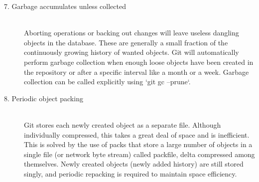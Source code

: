 \begin{description}
\item[7. Garbage accumulates unless collected] \hfill \\
  Aborting operations or backing out changes will leave useless dangling objects
  in the database. These are generally a small fraction of the continuously
  growing history of wanted objects. Git will automatically perform garbage
  collection when enough loose objects have been created in the repository or
  after a specific interval like a month or a week. Garbage collection can be
  called explicitly using ‘git gc –prune‘.

\item[8. Periodic object packing] \hfill \\
  Git stores each newly created object as a separate file. Although individually
  compressed, this takes a great deal of space and is inefficient. This is
  solved by the use of packs that store a large number of objects in a single
  file (or network byte stream) called packfile, delta compressed among
  themselves. Newly created objects (newly added history) are still stored
  singly, and periodic repacking is required to maintain space efficiency.

\end{description}
